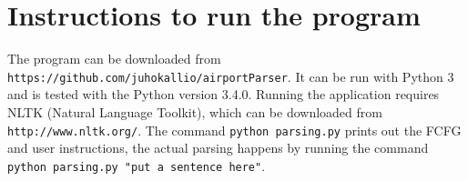 \documentclass[finnish]{article}
\begin{document}
\section{Instructions to run the program}
The program can be downloaded from \texttt{https://github.com/juhokallio/airportParser}. It can be run with Python 3 and is tested with the Python version 3.4.0. Running the application requires NLTK (Natural Language Toolkit), which can be downloaded from \texttt{http://www.nltk.org/}. The command \texttt{python parsing.py} prints out the FCFG and user instructions, the actual parsing happens by running the command \texttt{python parsing.py "put a sentence here"}.
\end{document}
